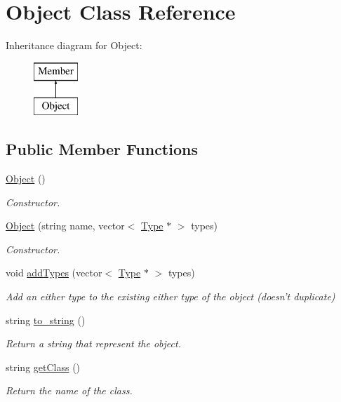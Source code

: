 \hypertarget{classObject}{\section{Object Class Reference}
\label{classObject}
}
Inheritance diagram for Object\+:\begin{figure}[H]
\begin{center}
\leavevmode
\includegraphics[height=2.000000cm]{classObject}
\end{center}
\end{figure}
\subsection*{Public Member Functions}
\begin{DoxyCompactItemize}
\item 
\hypertarget{classObject_a40860402e64d8008fb42329df7097cdb}{\hyperlink{classObject_a40860402e64d8008fb42329df7097cdb}{Object} ()}\label{classObject_a40860402e64d8008fb42329df7097cdb}

\begin{DoxyCompactList}\small\item\em Constructor. \end{DoxyCompactList}\item 
\hyperlink{classObject_af8967f65b73ffa66578b53f35521a926}{Object} (string name, vector$<$ \hyperlink{classType}{Type} $\ast$ $>$ types)
\begin{DoxyCompactList}\small\item\em Constructor. \end{DoxyCompactList}\item 
void \hyperlink{classObject_a8b4ff24815dcc0704db8db212b2ed01f}{add\+Types} (vector$<$ \hyperlink{classType}{Type} $\ast$ $>$ types)
\begin{DoxyCompactList}\small\item\em Add an either type to the existing either type of the object (doesn't duplicate) \end{DoxyCompactList}\item 
string \hyperlink{classObject_a520e44ab90b2d66a2c5c0874e19a688d}{to\+\_\+string} ()
\begin{DoxyCompactList}\small\item\em Return a string that represent the object. \end{DoxyCompactList}\item 
string \hyperlink{classObject_a397dca51f83eef1e5fc827aed391c2cf}{get\+Class} ()
\begin{DoxyCompactList}\small\item\em Return the name of the class. \end{DoxyCompactList}\end{DoxyCompactItemize}
